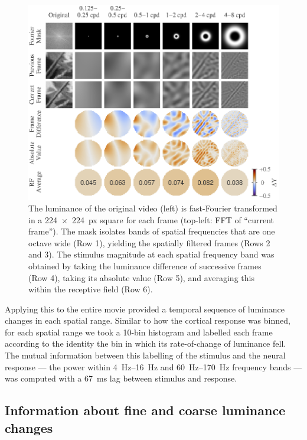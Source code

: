 \begin{figure}[htbp]
\centering \includegraphics[scale=1.2]{paperfigs/fig4.eps}
%
\caption{
The luminance of the original video (left) is fast-Fourier transformed in a \SI{224x224}{px} square for each frame (top-left: \ac{FFT} of  ``current frame'').
The mask isolates bands of spatial frequencies that are one octave wide (Row 1), yielding the spatially filtered frames (Rows 2 and 3).
The stimulus magnitude at each spatial frequency band was obtained by taking the luminance difference of successive frames (Row 4), taking its absolute value (Row 5), and averaging this within the receptive field (Row 6).
}%
\label{fig:lam_spares_method}
%
\end{figure}

Applying this to the entire movie provided a temporal sequence of luminance changes in each spatial range.
Similar to how the cortical response was binned, for each spatial range we took a \num{10}-bin histogram and labelled each frame according to the identity the bin in which its rate-of-change of luminance fell.
The mutual information between this labelling of the stimulus and the neural response --- the power within \SIrange{4}{16}{Hz} and \SIrange{60}{170}{Hz} frequency bands --- was computed with a \SI{67}{\milli\second} lag between stimulus and response.


\subsection{Information about fine and coarse luminance changes}

